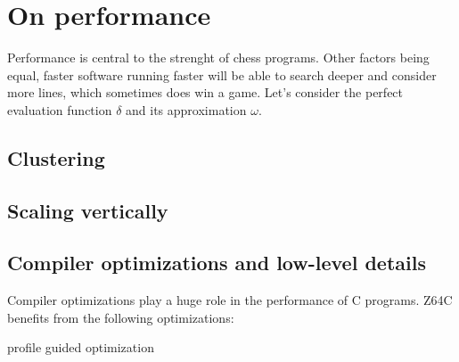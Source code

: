 \chapter{On performance}

Performance is central to the strenght of chess programs. Other factors being
equal, faster software running faster will be able to search deeper and consider
more lines, which sometimes does win a game. Let's consider the perfect
evaluation function $\delta$ and its approximation $\omega$.

\section{Clustering}
\section{Scaling vertically}
\section{Compiler optimizations and low-level details}

Compiler optimizations play a huge role in the performance of C programs. Z64C
benefits from the following optimizations:

profile guided optimization
